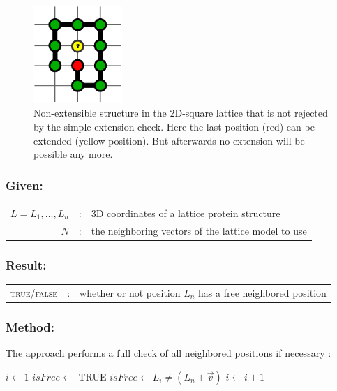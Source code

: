 \documentclass{article}
\begin{document}
\begin{figure}[H]
\begin{center}
	\includegraphics[width=0.3\textwidth]{square-stucked}
	\caption{Non-extensible structure in the 2D-square lattice that is not
	rejected by the simple extension check. Here the last position (red) can be
	extended (yellow position). But afterwards no extension will be possible any
	more.}
	\label{fig:squareStucked}
\end{center}
\end{figure}


\subsubsection*{Given:}

\begin{tabular}{rcl}
	$L=L_1,\ldots,L_n$	&:& 3D coordinates of a lattice protein structure \\
	$N$ &:& the neighboring vectors of the lattice model to use \\
\end{tabular}

\subsubsection*{Result:}

\begin{tabular}{rcl}
	\textsc{true/false} &:& whether or not position $L_n$ has a free neighbored
	position
\end{tabular}

\subsubsection*{Method:}

The approach performs a full check of all neighbored positions if necessary :

\vspace{0.5em}
\begin{algorithmic}[1]
		\State $i \gets 1$
		\State $isFree \gets$ \textsc{TRUE}
			\State $isFree \gets L_i \neq (L_n + \vec v)$ 
			\State $i \gets i+1$
		\EndWhile
			\State{} 
		\EndIf
	\EndFor
	\State {} 
\end{algorithmic}
\end{document}
